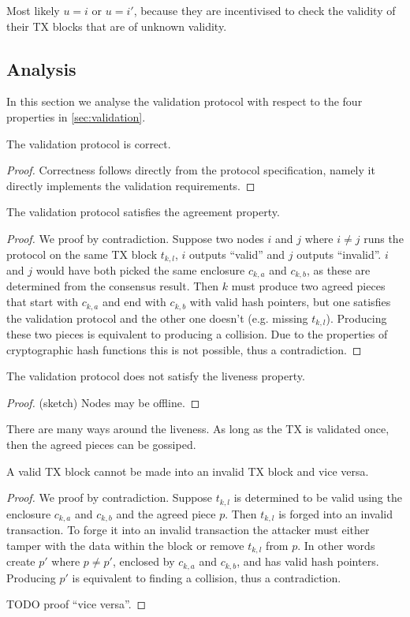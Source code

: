Most likely $u = i$ or $u = i'$, because they are incentivised to check the
validity of their TX blocks that are of unknown validity.

\subsection{Analysis}
In this section we analyse the validation protocol with respect to the four
properties in \cref{sec:validation}.

\begin{lemma}
  The validation protocol is correct.
\end{lemma}
\begin{proof}
  Correctness follows directly from the protocol specification, namely it
  directly implements the validation requirements.
\end{proof}

\begin{lemma}
  The validation protocol satisfies the agreement property.
\end{lemma}
\begin{proof}
  We proof by contradiction. Suppose two nodes $i$ and $j$ where $i \ne j$ runs
  the protocol on the same TX block $t_{k, l}$, $i$ outputs ``valid'' and $j$
  outputs ``invalid''. $i$ and $j$ would have both picked the same enclosure
  $c_{k, a}$ and $c_{k, b}$, as these are determined from the consensus result.
  Then $k$ must produce two agreed pieces that start with $c_{k,a}$ and end with
  $c_{k, b}$ with valid hash pointers, but one satisfies the validation protocol
  and the other one doesn't (e.g. missing $t_{k, l}$). Producing these two
  pieces is equivalent to producing a collision. Due to the properties of
  cryptographic hash functions this is not possible, thus a contradiction.
\end{proof}

\begin{lemma}
  The validation protocol does not satisfy the liveness property.
\end{lemma}
\begin{proof}
  (sketch) Nodes may be offline.
\end{proof}

There are many ways around the liveness. As long as the TX is validated once,
then the agreed pieces can be gossiped.

\begin{lemma}
  A valid TX block cannot be made into an invalid TX block and vice versa.
\end{lemma}
\begin{proof}
  We proof by contradiction. Suppose $t_{k, l}$ is determined to be valid using
  the enclosure $c_{k, a}$ and $c_{k, b}$ and the agreed piece $p$. Then $t_{k,
    l}$ is forged into an invalid transaction. To forge it into an invalid
  transaction the attacker must either tamper with the data within the block or
  remove $t_{k, l}$ from $p$. In other words create $p'$ where $p \ne p'$,
  enclosed by $c_{k, a}$ and $c_{k, b}$, and has valid hash pointers. Producing
  $p'$ is equivalent to finding a collision, thus a contradiction.

  TODO proof ``vice versa''.
\end{proof}


